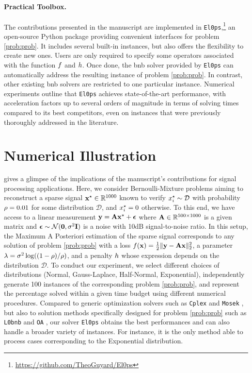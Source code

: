 \documentclass[11pt]{article}
\begin{document}
\paragraph{Practical Toolbox.}
The contributions presented in the manuscript are implemented in \texttt{El0ps},\footnote{\url{https://github.com/TheoGuyard/El0ps}} an open-source Python package providing convenient interfaces for problem \eqref{prob:prob}.
It includes several built-in instances, but also offers the flexibility to create new ones.
Users are only required to specify some operators associated with the function $f$ and $h$.
Once done, the \gls{bnb} solver provided by \texttt{El0ps} can automatically address the resulting instance of problem \eqref{prob:prob}.
In contrast, other existing \gls{bnb} solvers are restricted to one particular instance.
Numerical experiments outline that \texttt{El0ps} achieves state-of-the-art performance, with acceleration factors up to several orders of magnitude in terms of solving times compared to its best competitors, even on instances that were previously thoroughly addressed in the literature.

\section{Numerical Illustration}
\label{sec:numerics}

 gives a glimpse of the implications of the manuscript's contributions for signal processing applications.
Here, we consider Bernoulli-Mixture problems \cite{soussen2011bernoulli} aiming to reconstruct a sparse signal $\groundtruth \in \kR^{1000}$ known to verify $x_{i}^{\star} \sim \mathcal{D}$ with probability $\rho = 0.01$ for some distribution $\mathcal{D}$, and $x_{i}^{\star}=0$ otherwise. 
To this end, we have access to a linear measurement $\mathbf{y} = \mathbf{A}\mathbf{x}^{\star} + \boldsymbol{\epsilon}$ where $\dic \in \kR^{500 \times 1000}$ is a given matrix and $\boldsymbol{\epsilon} \sim \mathcal{N}(\mathbf{0},\sigma^2 \mathbf{I})$ is a noise with 10dB signal-to-noise ratio.
In this setup, the Maximum A Posteriori estimation of the sparse signal corresponds to any solution of problem \eqref{prob:prob} with
a loss $f(\mathbf{x}) = \frac{1}{2}\|\mathbf{y} - \mathbf{A}\mathbf{x}\|_2^2$,
a parameter $\lambda = \sigma^2\log((1-\rho)/\rho)$,
and a penalty $h$ whose expression depends on the distribution $\mathcal{D}$.
To conduct our experiment, we select different choices of distributions (Normal, Gauss-Laplace, Half-Normal, Exponential), independently generate 100 instances of the corresponding problem \eqref{prob:prob}, and represent the percentage solved within a given time budget using different numerical procedures.
Compared to generic optimization solvers such as \texttt{Cplex} and \texttt{Mosek} \cite{kronqvist2019review}, but also to solution methods specifically designed for problem \eqref{prob:prob} such as \texttt{L0bnb} \cite{hazimeh2022sparse} and \texttt{OA} \cite{bertsimas2021unified}, our solver \texttt{El0ps} obtains the best performances and can also handle a broader variety of instances. 
For instance, it is the only method able to process cases corresponding to the Exponential distribution.
\end{document}
